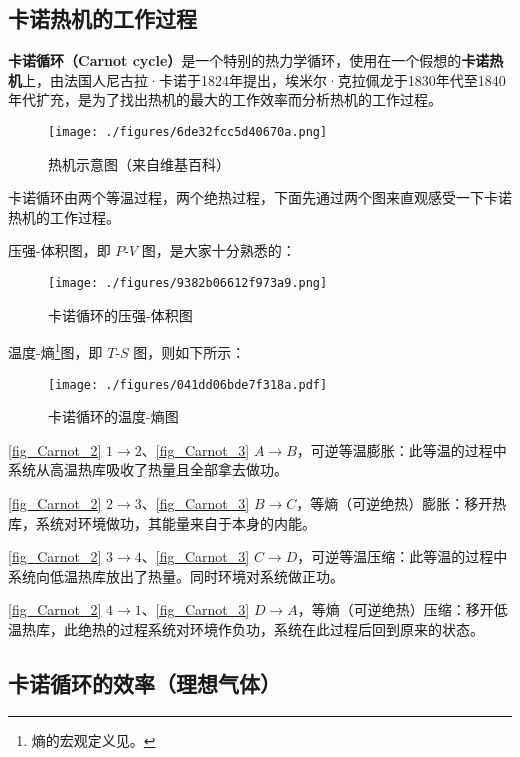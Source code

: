 


\subsection{卡诺热机的工作过程}
\textbf{卡诺循环（Carnot cycle）}是一个特别的热力学循环，使用在一个假想的\textbf{卡诺热机}上，由法国人尼古拉·卡诺于1824年提出，埃米尔·克拉佩龙于1830年代至1840年代扩充，是为了找出热机的最大的工作效率而分析热机的工作过程。

\begin{figure}[ht]
\centering
\texttt{[image: ./figures/6de32fcc5d40670a.png]}
\caption{热机示意图（来自维基百科）} \label{fig_Carnot_1}
\end{figure}
卡诺循环由两个等温过程，两个绝热过程，下面先通过两个图来直观感受一下卡诺热机的工作过程。

压强-体积图，即 $P$-$V$ 图，是大家十分熟悉的：

\begin{figure}[ht]
\centering
\texttt{[image: ./figures/9382b06612f973a9.png]}
\caption{卡诺循环的压强-体积图} \label{fig_Carnot_2}
\end{figure}

温度-熵\footnote{熵的宏观定义见。}图，即 $T$-$S$ 图，则如下所示：
\begin{figure}[ht]
\centering
\texttt{[image: ./figures/041dd06bde7f318a.pdf]}
\caption{卡诺循环的温度-熵图} \label{fig_Carnot_3}
\end{figure}

\autoref{fig_Carnot_2} $1\to 2$、\autoref{fig_Carnot_3} $A\to B$，可逆等温膨胀：此等温的过程中系统从高温热库吸收了热量且全部拿去做功。

\autoref{fig_Carnot_2} $2\to 3$、\autoref{fig_Carnot_3} $B\to C$，等熵（可逆绝热）膨胀：移开热库，系统对环境做功，其能量来自于本身的内能。

\autoref{fig_Carnot_2} $3\to 4$、\autoref{fig_Carnot_3} $C\to D$，可逆等温压缩：此等温的过程中系统向低温热库放出了热量。同时环境对系统做正功。

\autoref{fig_Carnot_2} $4\to 1$、\autoref{fig_Carnot_3} $D\to A$，等熵（可逆绝热）压缩：移开低温热库，此绝热的过程系统对环境作负功，系统在此过程后回到原来的状态。

\subsection{卡诺循环的效率（理想气体）}


